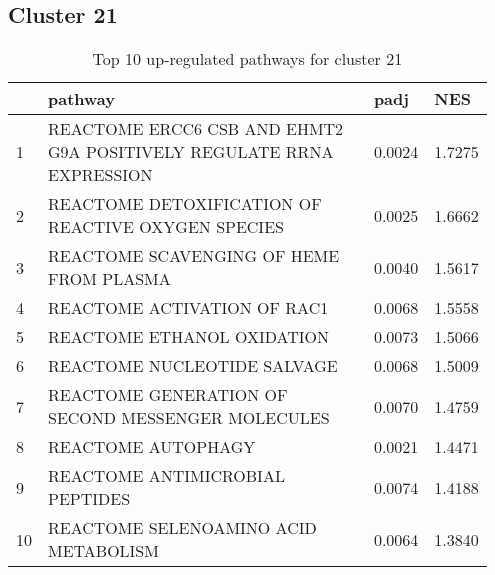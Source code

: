 \documentclass{article}
\begin{document}
\subsection{Cluster 21 }
\begin{table}[H]
\centering
\begin{tabular}{p{0.05\linewidth}p{0.7\linewidth}p{0.1\linewidth}p{0.1\linewidth}}
  \hline
 & pathway & padj & NES \\ 
  \hline
1 & REACTOME ERCC6 CSB AND EHMT2 G9A POSITIVELY REGULATE RRNA EXPRESSION & 0.0024 & 1.7275 \\ 
  2 & REACTOME DETOXIFICATION OF REACTIVE OXYGEN SPECIES & 0.0025 & 1.6662 \\ 
  3 & REACTOME SCAVENGING OF HEME FROM PLASMA & 0.0040 & 1.5617 \\ 
  4 & REACTOME ACTIVATION OF RAC1 & 0.0068 & 1.5558 \\ 
  5 & REACTOME ETHANOL OXIDATION & 0.0073 & 1.5066 \\ 
  6 & REACTOME NUCLEOTIDE SALVAGE & 0.0068 & 1.5009 \\ 
  7 & REACTOME GENERATION OF SECOND MESSENGER MOLECULES & 0.0070 & 1.4759 \\ 
  8 & REACTOME AUTOPHAGY & 0.0021 & 1.4471 \\ 
  9 & REACTOME ANTIMICROBIAL PEPTIDES & 0.0074 & 1.4188 \\ 
  10 & REACTOME SELENOAMINO ACID METABOLISM & 0.0064 & 1.3840 \\ 
   \hline
\end{tabular}
\caption{Top 10 up-regulated pathways for cluster 21} 
\label{tab:q3_2_21}
\end{table}
\end{document}
